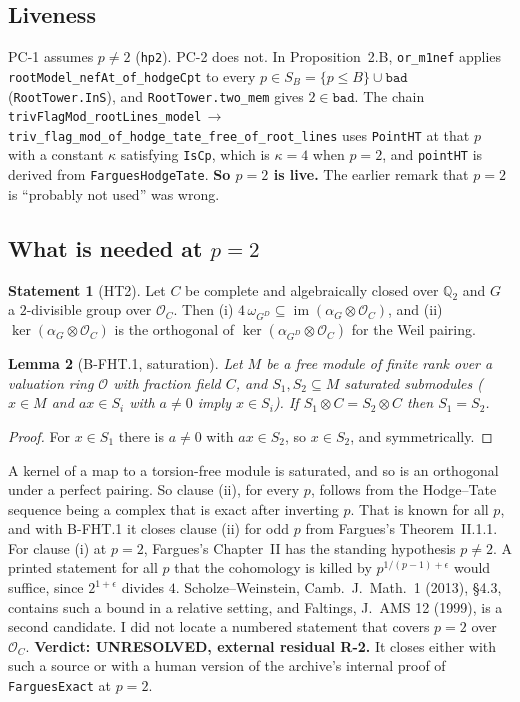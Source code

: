 \documentclass[11pt]{article}
\newcommand{\lean}[1]{\nolinkurl{#1}}
\newtheorem{lemma}{Lemma}
\theoremstyle{definition}
\newtheorem{statement}[lemma]{Statement}
\begin{document}
\subsection{Liveness}

PC-1 assumes $p\ne2$ (\lean{hp2}). PC-2 does not. In Proposition~2.B, \lean{or_m1nef} applies \lean{rootModel_nefAt_of_hodgeCpt} to every $p\in S_B=\{p\le B\}\cup\texttt{bad}$ (\lean{RootTower.InS}), and \lean{RootTower.two_mem} gives $2\in\texttt{bad}$. The chain \lean{trivFlagMod_rootLines_model}$\,\to\,$\lean{triv_flag_mod_of_hodge_tate_free_of_root_lines} uses \lean{PointHT} at that $p$ with a constant $\kappa$ satisfying \lean{IsCp}, which is $\kappa=4$ when $p=2$, and \lean{pointHT} is derived from \lean{FarguesHodgeTate}. \textbf{So $p=2$ is live.} The earlier remark that $p=2$ is ``probably not used'' was wrong.

\subsection{What is needed at $p=2$}

\begin{statement}[HT2]
Let $C$ be complete and algebraically closed over $\mathbb Q_2$ and $G$ a $2$-divisible group over $\mathcal O_C$. Then (i) $4\,\omega_{G^D}\subseteq\operatorname{im}(\alpha_G\otimes\mathcal O_C)$, and (ii) $\ker(\alpha_G\otimes\mathcal O_C)$ is the orthogonal of $\ker(\alpha_{G^D}\otimes\mathcal O_C)$ for the Weil pairing.
\end{statement}

\begin{lemma}[B-FHT.1, saturation]
Let $M$ be a free module of finite rank over a valuation ring $\mathcal O$ with fraction field $C$, and $S_1,S_2\subseteq M$ saturated submodules ($x\in M$ and $ax\in S_i$ with $a\ne0$ imply $x\in S_i$). If $S_1\otimes C=S_2\otimes C$ then $S_1=S_2$.
\end{lemma}
\begin{proof}
For $x\in S_1$ there is $a\ne0$ with $ax\in S_2$, so $x\in S_2$, and symmetrically.
\end{proof}

A kernel of a map to a torsion-free module is saturated, and so is an orthogonal under a perfect pairing. So clause (ii), for every $p$, follows from the Hodge--Tate sequence being a complex that is exact after inverting $p$. That is known for all $p$, and with B-FHT.1 it closes clause (ii) for odd $p$ from Fargues's Theorem~II.1.1. For clause (i) at $p=2$, Fargues's Chapter~II has the standing hypothesis $p\ne2$. A printed statement for all $p$ that the cohomology is killed by $p^{1/(p-1)+\epsilon}$ would suffice, since $2^{1+\epsilon}$ divides $4$. Scholze--Weinstein, Camb.\ J.\ Math.\ 1 (2013), §4.3, contains such a bound in a relative setting, and Faltings, J.\ AMS 12 (1999), is a second candidate. I did not locate a numbered statement that covers $p=2$ over $\mathcal O_C$. \textbf{Verdict: UNRESOLVED, external residual R-2.} It closes either with such a source or with a human version of the archive's internal proof of \lean{FarguesExact} at $p=2$.
\end{document}
